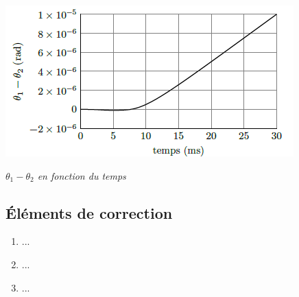 \documentclass[10pt,fleqn]{article} %
\begin{document}
\begin{multicols}{2}
\begin{center}
\includegraphics[width=\linewidth]{images/image21.png}

\textit{$\theta_1-\theta_2$ en
fonction du temps \label{fig20}}
\end{center}


\subsection*{Éléments de correction}
\begin{enumerate}
\item ...
\item ...
\item ...
\end{enumerate}
\end{multicols}

%
\end{document}
